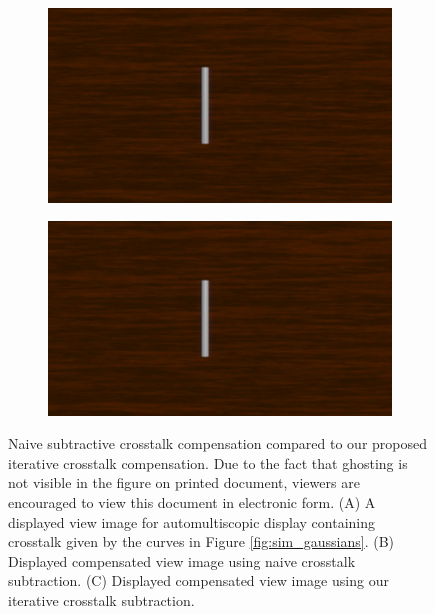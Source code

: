 \begin{figure}[htbp]
    \begin{subfigure}[b]{0.48\textwidth}
        \includegraphics[width=\textwidth]{./Template_Figures/subtractive_comp}
        \caption{}\label{fig:subtractive_lf}
    \end{subfigure}
    \begin{subfigure}[b]{0.48\textwidth}
        \includegraphics[width=\textwidth]{./Template_Figures/iterative_comp}
        \caption{}\label{fig:iterative_lf}
    \end{subfigure}

    \caption{Naive subtractive crosstalk compensation compared to our proposed iterative crosstalk compensation. Due to the fact that ghosting is not visible in the figure on printed document, viewers are encouraged to view this document in electronic form. (A) A displayed view image for automultiscopic display containing crosstalk given by the curves in Figure \ref{fig:sim_gaussians}. (B) Displayed compensated view image using naive crosstalk subtraction. (C) Displayed compensated view image using our iterative crosstalk subtraction. \label{fig:iterative_tech}}
\end{figure}



